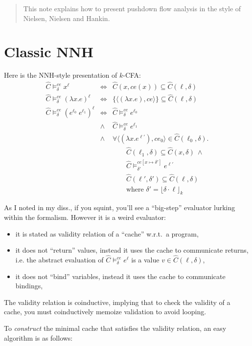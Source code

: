 \documentclass[12pt]{article}
\newcommand\cache{\widehat{C}}
\newcommand\mvar{x}
\newcommand\mlab{\ell}
\newcommand\mexp{e}
\newcommand\mval{v}
\newcommand\mlvar{\mvar^\mlab}
\newcommand\mce{{\mathit{ce}}}
\newcommand\mcntr{\delta}
\newcommand\slam[2]{(\lambda{#1}.{#2})}
\newcommand\sllam[2]{\slam{#1}{#2}^{\mlab}}
\newcommand\slapp[2]{({#1}\;{#2})^\mlab}
\newcommand\sclos[2]{\langle{#1},{#2}\rangle}
\newcommand\NNH[1]{\NNHalt\mce\mcntr{#1}}
\newcommand\NNHalt[3]{\cache\models^{#1}_{#2} {#3}}
\begin{document}
\begin{abstract}
This note explains how to present pushdown flow analysis in the style
of Nielsen, Nielsen and Hankin.
\end{abstract}
\section{Classic NNH}

Here is the NNH-style presentation of $k$-CFA:
\[
\begin{array}{lcl}
\NNH\mlvar
&\iff&
\cache(\mvar,\mce(\mvar)) \subseteq \cache(\mlab,\mcntr)
\\[2mm]
\NNH{\sllam\mvar\mexp}
&\iff&
\{\sclos{\slam\mvar\mexp}\mce\} \subseteq \cache(\mlab,\mcntr)
\\[2mm]
\NNH{\slapp{\mexp^{\mlab_0}}{\mexp^{\mlab_1}}}
&\iff&
\NNH{\mexp^{\mlab_0}}\\
&\wedge&
\NNH{\mexp^{\mlab_1}}\\
&\wedge&
\forall \sclos{\slam\mvar{\mexp^{\mlab'}}}{\mce_0} \in \cache(\mlab_0,\mcntr).\\
&&
\qquad \cache(\mlab_1,\mcntr) \subseteq \cache(\mvar,\mcntr)\  \wedge\\
&&
\qquad \NNHalt{\mce[\mvar\mapsto\mcntr']}{\mcntr'}{\mexp^{\mlab'}}\\
&&
\qquad \cache(\mlab',\mcntr') \subseteq \cache(\mlab,\mcntr)
\\
&&
\qquad \mbox{where }\mcntr' = \lfloor \mcntr\cdot\mlab \rfloor_k
\end{array}
\]


As I noted in my diss., if you squint, you'll see a ``big-step''
evaluator lurking within the formalism.  However it is a weird evaluator:
\begin{itemize}
\item it is stated as validity relation of a ``cache'' w.r.t.~a program,
\item it does not ``return'' values, instead it uses the cache to
  communicate returns, i.e. the abstract evaluation of
  $\NNH{\mexp^\mlab}$ is a value $\mval \in \cache(\mlab,\mcntr)$,
\item it does not ``bind'' variables, instead it uses the cache to
communicate bindings,
\end{itemize}

The validity relation is coinductive, implying that to check the
validity of a cache, you must coinductively memoize validation to
avoid looping.

To \emph{construct} the minimal cache that satisfies the validity
relation, an easy algorithm is as follows:
\end{document}
